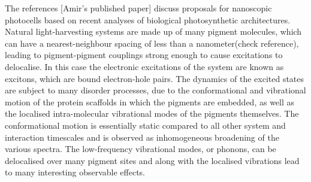 \documentclass[]{article}
\begin{document}
The references \cite{Creatore2013}\cite{Dorfman}[Amir's published paper] discuss proposals for nanoscopic photocells based on recent analyses of biological photosynthetic architectures. Natural light-harvesting systems are made up of many pigment molecules, which can have a nearest-neighbour spacing of less than a nanometer\cite{Adolphs2006}(check reference), leading to pigment-pigment couplings strong enough to cause excitations to delocalise. In this case the electronic excitations of the system are known as excitons, which are bound electron-hole pairs. The dynamics of the excited states are subject to many disorder processes, due to the conformational and vibrational motion of the protein scaffolds in which the pigments are embedded, as well as the localised intra-molecular vibrational modes of the pigments themselves\cite{}. The conformational motion is essentially static compared to all other system and interaction timescales and is observed as inhomogeneous broadening of the various spectra. The low-frequency vibrational modes, or phonons, can be delocalised over many pigment sites and along with the localised vibrations lead to many interesting observable effects.
\end{document}
